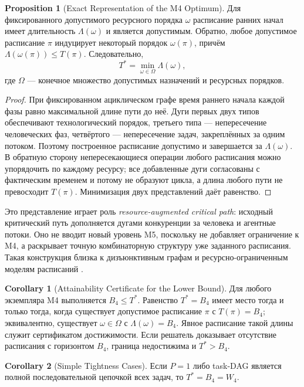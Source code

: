 \documentclass[12pt,a4paper]{article}
\theoremstyle{definition}
\newtheorem{proposition}{Proposition}
\newtheorem{corollary}{Corollary}
\begin{document}
\begin{proposition}[Exact Representation of the M4 Optimum]\label{prop:resource-graph}
Для фиксированного допустимого ресурсного порядка $\omega$ расписание ранних начал имеет длительность $\Lambda(\omega)$ и является допустимым. Обратно, любое допустимое расписание $\pi$ индуцирует некоторый порядок $\omega(\pi)$, причём $\Lambda(\omega(\pi))\le T(\pi)$. Следовательно,
\[
  T^{*}=\min_{\omega\in\Omega}\Lambda(\omega),
\]
где $\Omega$ --- конечное множество допустимых назначений и ресурсных порядков.
\end{proposition}

\begin{proof}
При фиксированном ациклическом графе время раннего начала каждой фазы равно максимальной длине пути до неё. Дуги первых двух типов обеспечивают технологический порядок, третьего типа --- непересечение человеческих фаз, четвёртого --- непересечение задач, закреплённых за одним потоком. Поэтому построенное расписание допустимо и завершается за $\Lambda(\omega)$. В обратную сторону непересекающиеся операции любого расписания можно упорядочить по каждому ресурсу; все добавленные дуги согласованы с фактическим временем и потому не образуют цикла, а длина любого пути не превосходит $T(\pi)$. Минимизация двух представлений даёт равенство.
\end{proof}

Это представление играет роль \emph{resource-augmented critical path}: исходный критический путь дополняется дугами конкуренции за человека и агентные потоки. Оно не вводит новый уровень M5, поскольку не добавляет ограничение к M4, а раскрывает точную комбинаторную структуру уже заданного расписания. Такая конструкция близка к дизъюнктивным графам и ресурсно-ограниченным моделям расписаний \cite{brucker1999resource}.

\begin{corollary}[Attainability Certificate for the Lower Bound]\label{cor:attainability}
Для любого экземпляра M4 выполняется $B_4\le T^{*}$. Равенство $T^{*}=B_4$ имеет место тогда и только тогда, когда существует допустимое расписание $\pi$ с $T(\pi)=B_4$; эквивалентно, существует $\omega\in\Omega$ с $\Lambda(\omega)=B_4$. Явное расписание такой длины служит сертификатом достижимости. Если решатель доказывает отсутствие расписания с горизонтом $B_4$, граница недостижима и $T^{*}>B_4$.
\end{corollary}

\begin{corollary}[Simple Tightness Cases]\label{cor:simple-tightness}
Если $P=1$ либо task-DAG является полной последовательной цепочкой всех задач,
то $T^*=B_4=W_4$.
\end{corollary}
\end{document}
